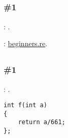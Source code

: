 \subsection{}

\subsubsection{\Exercise \#1}
\label{exercise_solutions_obfuscation_1}

\Exercise: .

: \href{http://go.yurichev.com/17162}{beginners.re}.

\subsection{}

\subsubsection{\Exercise \#1}
\label{exercise_solutions_arith_optimizations_1}

\Exercise: .

\begin{lstlisting}
int f(int a)
{
	return a/661;
};
\end{lstlisting}
